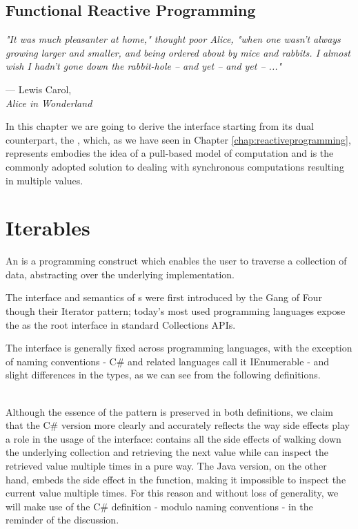 \subsection{Functional Reactive Programming}



\epigraph{\hspace{4ex}\textit{"It was much pleasanter at home," thought poor Alice, "when one wasn't always growing larger and smaller, and being ordered about by mice and rabbits. I almost wish I hadn't gone down the rabbit-hole -- and yet -- and yet -- ..."}}{--- Lewis Carol,\\ \textit{Alice in Wonderland}}


In this chapter we are going to derive the  interface starting from its dual counterpart, the , which, as we have seen in Chapter \ref{chap:reactiveprogramming}, represents embodies the idea of a pull-based model of computation and is the commonly adopted solution to dealing with synchronous computations resulting in multiple values.

\section{Iterables}
\label{sec:iterables}

An  is a programming construct which enables the user to traverse a collection of data, abstracting over the underlying implementation\cite{gamma1995design}.

The interface and semantics of s were first introduced by the Gang of Four though their Iterator pattern\cite{gamma1995design}; today's most used programming languages expose the  as the root interface in standard Collections APIs. 

The  interface is generally fixed across programming languages, with the exception of naming conventions - C\# and related languages call it IEnumerable - and slight differences in the types, as we can see from the following definitions.\\

\\

Although the essence of the pattern is preserved in both definitions, we claim that the C\# version more clearly and accurately reflects the way side effects play a role in the usage of the interface:  contains all the side effects of walking down the underlying collection and retrieving the next value while  can inspect the retrieved value multiple times in a pure way. The Java version, on the other hand, embeds the side effect in the  function, making it impossible to inspect the current value multiple times. For this reason and without loss of generality, we will make use of the C\# definition - modulo naming conventions - in the reminder of the discussion.\\

